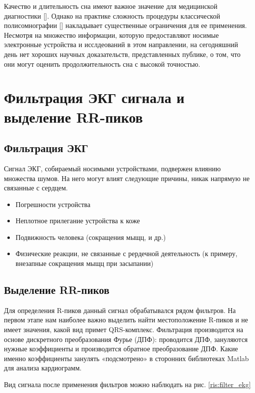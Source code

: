 Качество и длительность сна имеют важное значение для медицинской диагностики []. Однако на практике сложность процедуры классической полисомнографии [] накладывает существенные ограничения для ее применения. Несмотря на множество информации, которую предоставляют носимые электронные устройства и исслдеований в этом направлении, на сегодняшний день нет хороших научных доказательств, представленных публике, о том, что они могут оценить продолжительность сна с высокой точностью.

\section{Фильтрация ЭКГ сигнала и выделение RR-пиков}
\subsection{Фильтрация ЭКГ}
Сигнал ЭКГ, собираемый носимыми устройствами, подвержен влиянию множества шумов. На него могут влият следующие причины, никак напрямую не связанные с сердцем.
\begin{itemize}
	\item Погрешности устройства
	\item Неплотное прилегание устройства к коже
	\item Подвижность человека (сокращения мыщц, и др.)
	\item Физические реакции, не связанные с рердечной деятельность (к примеру, внезапные сокращения мыщц при засыпании)
\end{itemize}


\subsection{Выделение RR-пиков}
Для определения R-пиков данный сигнал обрабатывался рядом фильтров. На первом этапе нам наиболее важно выделить найти местоположение R-пиков и не имеет значения, какой вид примет QRS-комплекс. Фильтрация производится на основе дискретного преобразования Фурье (ДПФ): проводится ДПФ, зануляются нужные коэффициенты и производится обратное преобразование ДПФ. Какие именно коэффициенты занулять «подсмотрено» в сторонних библиотеках Matlab для анализа кардиограмм.

Вид сигнала после применения фильтров можно наблюдать на рис.  \ref{ris:filter_ekg}

